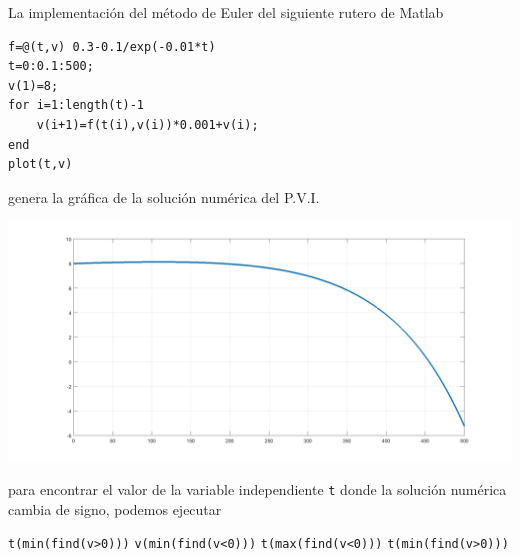 \begin{pregunta}
\begin{cuerpo}
La implementaci\'on del m\'etodo de Euler del siguiente rutero de Matlab 
\begin{lstlisting}
f=@(t,v) 0.3-0.1/exp(-0.01*t)
t=0:0.1:500;
v(1)=8;
for i=1:length(t)-1
    v(i+1)=f(t(i),v(i))*0.001+v(i);
end
plot(t,v)
\end{lstlisting}
genera la gr\'afica de la soluci\'on num\'erica del P.V.I. 
\begin{center}
\includegraphics[width=\textwidth]{./img/p17.jpg}
\end{center}
para encontrar el valor de la variable independiente \texttt{t} donde la soluci\'on num\'erica cambia de signo, podemos ejecutar
\end{cuerpo}

\begin{multicols}{2}
\begin{alternativas}
{\texttt{t(min(find(v>0)))}}
{\texttt{v(min(find(v<0)))}}
{\texttt{t(max(find(v<0)))}}
{\texttt{t(min(find(v>0)))}}
\end{alternativas}
\end{multicols}
\justificacion{0cm}
\end{pregunta}